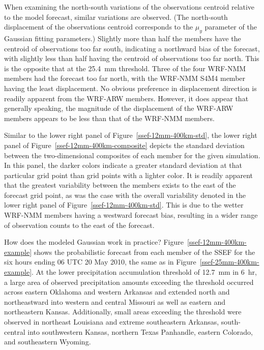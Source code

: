 When examining the north-south variations of the observations centroid relative to the model forecast, similar variations are observed.
(The north-south displacement of the observations centroid corresponds to the $\mu_y$ parameter of the Gaussian fitting parameters.)
Slightly more than half the members have the centroid of observations too far south, indicating a northward bias of the forecast, with slightly less than half having the centroid of observations too far north.
This is the opposite that at the \mbox{25.4 mm} threshold.
Three of the four WRF-NMM members had the forecast too far north, with the WRF-NMM S4M4 member having the least displacement.
No obvious preference in displacement direction is readily apparent from the WRF-ARW members.
However, it does appear that generally speaking, the magnitude of the displacement of the WRF-ARW members appears to be less than that of the WRF-NMM members.


Similar to the lower right panel of \mbox{Figure \ref{ssef-12mm-400km-std}}, the lower right panel of \mbox{Figure \ref{ssef-12mm-400km-composite}} depicts the standard deviation between the two-dimensional composites of each member for the given simulation.
In this panel, the darker colors indicate a greater standard deviation at that particular grid point than grid points with a lighter color.
It is readily apparent that the greatest variability between the members exists to the east of the forecast grid point, as was the case with the overall variability denoted in the lower right panel of \mbox{Figure \ref{ssef-12mm-400km-std}}.
This is due to the wetter WRF-NMM members having a westward forecast bias, resulting in a wider range of observation counts to the east of the forecast.


How does the modeled Gaussian work in practice?
\mbox{Figure \ref{ssef-12mm-400km-example}} shows the probabilistic forecast from each member of the SSEF for the six hours ending 06 UTC 20 May 2010, the same as in \mbox{Figure \ref{ssef-25mm-400km-example}}.
At the lower precipitation accumulation threshold of \mbox{12.7 mm} in \mbox{6 hr}, a large area of observed precipitation amounts exceeding the threshold occurred across eastern Oklahoma and western Arkansas and extended north and northeastward into western and central Missouri as well as eastern and northeastern Kansas.
Additionally, small areas exceeding the threshold were observed in northeast Louisiana and extreme southeastern Arkansas, south-central into southwestern Kansas, northern Texas Panhandle, eastern Colorado, and southeastern Wyoming.


